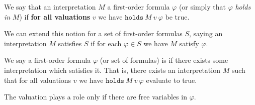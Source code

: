 \begin{node}[Semantics]
\begin{definition}\label{fol-000E}%
We say that an interpretation $M$  a first-order
formula $\varphi$ (or simply that $\varphi$ \textit{holds in} $M$) if
\textbf{for all valuations} $v$ we have $\mathtt{holds}~M~v~\varphi$
be true.

We can extend this notion for a set of first-order formulas $S$, saying
an interpretation $M$ satisfies $S$ if for each $\varphi\in S$ we have
$M$ satisfy $\varphi$.
\end{definition}

\begin{definition}\label{fol-000F}%
We say a first-order formula $\varphi$ (or set of formulas) is
 if there exists some interpretation which satisfies it.
That is, there exists an interpretation $M$ such that for all valuations
$v$ we have $\mathtt{holds}~M~v~\varphi$ evaluate to true.

The valuation plays a role only if there are free variables in $\varphi$.
\end{definition}
\end{node}


